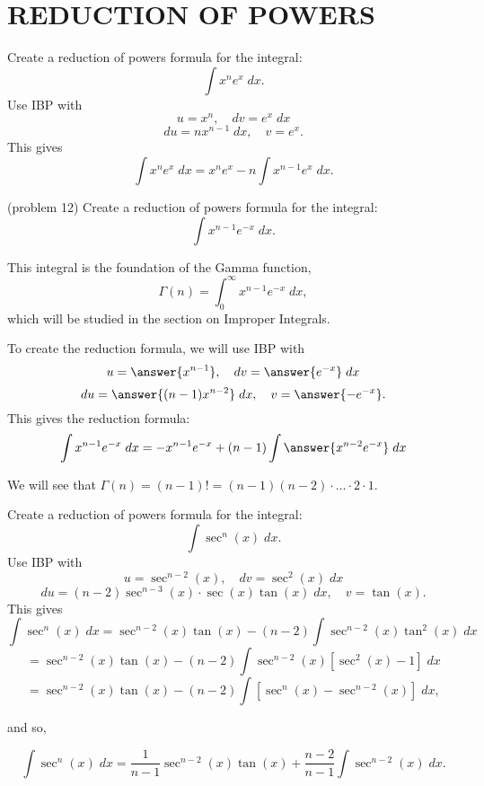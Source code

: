 \documentclass[handout]{ximera}
\begin{document}

\section{REDUCTION OF POWERS}


\begin{example}[example 12]
Create a reduction of powers formula for the integral:
\[
\int x^n e^x \; dx.
\]
Use IBP with
\[
u = x^n, \quad dv = e^x \; dx
\]
\[
du = nx^{n-1}\; dx,  \quad v = e^x.
\]
This gives
\[
\int x^n e^x \; dx = x^n e^x - n\int x^{n-1} e^x \; dx.
\]
\end{example}

\begin{problem}(problem 12)
Create a reduction of powers formula for the integral:
\[
\int x^{n-1}e^{-x} \; dx.
\]
\begin{remark}
This integral is the foundation of the Gamma function,
\[
\Gamma(n) = \int_0^\infty x^{n-1}e^{-x} \; dx,
\]
which will be studied in the section on Improper Integrals.
\end{remark}
To create the reduction formula, we will use IBP with
\[
u = \answer{x^{n-1}}, \quad dv = \answer{e^{-x}} \; dx
\]
\[
du = \answer{(n-1)x^{n-2}}\; dx,  \quad v = \answer{-e^{-x}}.
\]
This gives the reduction formula:
\[
\int x^{n-1}e^{-x} \; dx = -x^{n-1}e^{-x} + (n-1)\int \answer{x^{n-2}e^{-x}} \; dx
\]
\begin{remark}
We will see that $\Gamma(n) = (n-1)! = (n-1)(n-2)\cdot \ldots \cdot 2 \cdot 1$.
\end{remark}

\end{problem}




\begin{example}[example 13]
Create a reduction of powers formula for the integral:
\[
\int \sec^n(x) \; dx.
\]
Use IBP with
\[
u = \sec^{n-2}(x), \quad dv = \sec^2(x) \; dx
\]
\[
du = (n-2)\sec^{n-3}(x) \cdot \sec(x)\tan(x)\; dx,  \quad v = \tan(x).
\]
This gives
\[
\int \sec^n(x) \; dx = \sec^{n-2}(x)\tan(x) - (n-2)\int \sec^{n-2}(x)\tan^2(x) \; dx
\]
\[
= \sec^{n-2}(x)\tan(x) - (n-2)\int \sec^{n-2}(x)[\sec^2(x) - 1] \; dx
\]
\[
= \sec^{n-2}(x)\tan(x) - (n-2)\int [\sec^n(x)-\sec^{n-2}(x)]\; dx,
\]

and so,

\[
\int \sec^n(x) \; dx = \frac{1}{n-1}\sec^{n-2}(x)\tan(x) + \frac{n-2}{n-1}\int \sec^{n-2}(x) \; dx.
\]

\end{example}
\end{document}
